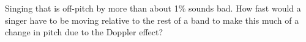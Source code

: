 Singing that is off-pitch by more than about 1\% sounds
bad. How fast would a singer have to be moving relative to
the rest of a band to make this much of a change in pitch
due to the Doppler effect?\answercheck
